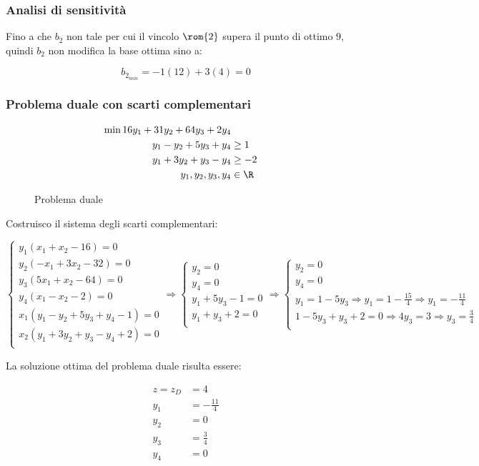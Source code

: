 \documentclass[\main/main.tex]{subfiles}
\begin{document}
\subsubsection*{Analisi di sensitività}
Fino a che $b_2$ non tale per cui il vincolo $\rom{2}$ supera il punto di ottimo $9$, quindi $b_2$ non modifica la base ottima sino a:

\[
  b_{2_{min}} = -1(12) + 3(4) = 0
\]

\subsubsection*{Problema duale con scarti complementari}

\begin{figure}
  \begin{align*}
    \min 16y_1 + 31y_2 + 64y_3 + 2y_4 \\
    y_1 -y_2 + 5y_3 + y_4 & \geq 1    \\
    y_1 +3y_2 + y_3 - y_4 & \geq -2   \\
    y_1, y_2, y_3, y_4    & \in \R
  \end{align*}
  \caption{Problema duale}
\end{figure}

Costruisco il sistema degli scarti complementari:

\[
  \begin{cases}
    y_1(x_1+x_2-16)=0              \\
    y_2(-x_1+3x_2-32)=0            \\
    y_3(5x_1+x_2-64)=0             \\
    y_4(x_1-x_2-2)=0               \\
    x_1(y_1 -y_2 + 5y_3 + y_4-1)=0 \\
    x_2(y_1 +3y_2 + y_3 - y_4+2)=0 \\
  \end{cases}
  \Rightarrow
  \begin{cases}
    y_2=0          \\
    y_4=0          \\
    y_1 + 5y_3-1=0 \\
    y_1 + y_3+2=0  \\
  \end{cases}
  \Rightarrow
  \begin{cases}
    y_2=0                                                                       \\
    y_4=0                                                                       \\
    y_1=1-5y_3 \Rightarrow y_1 = 1-\frac{15}{4} \Rightarrow y_1 = -\frac{11}{4} \\
    1-5y_3 + y_3+2=0 \Rightarrow 4y_3 = 3 \Rightarrow y_3 = \frac{3}{4}         \\
  \end{cases}
\]

La soluzione ottima del problema duale risulta essere:

\begin{align*}
  z = z_D & = 4             \\
  y_1     & = -\frac{11}{4} \\
  y_2     & = 0             \\
  y_3     & = \frac{3}{4}   \\
  y_4     & = 0             \\
\end{align*}
\end{document}
